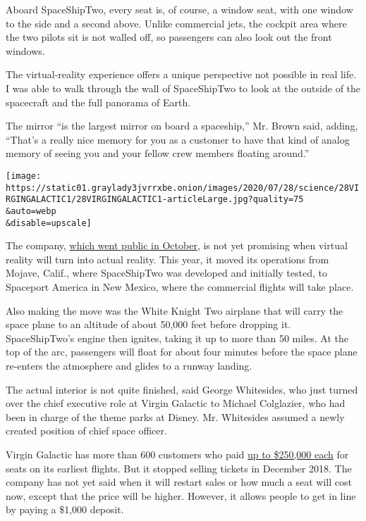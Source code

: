Aboard SpaceShipTwo, every seat is, of course, a window seat, with one
window to the side and a second above. Unlike commercial jets, the
cockpit area where the two pilots sit is not walled off, so passengers
can also look out the front windows.

The virtual-reality experience offers a unique perspective not possible
in real life. I was able to walk through the wall of SpaceShipTwo to
look at the outside of the spacecraft and the full panorama of Earth.

The mirror ``is the largest mirror on board a spaceship,'' Mr. Brown
said, adding, ``That's a really nice memory for you as a customer to
have that kind of analog memory of seeing you and your fellow crew
members floating around.''

\texttt{[image: https://static01.graylady3jvrrxbe.onion/images/2020/07/28/science/28VIRGINGALACTIC1/28VIRGINGALACTIC1-articleLarge.jpg?quality=75\\\&auto=webp\\\&disable=upscale]}

The company,
\href{https://www.nytimes3xbfgragh.onion/2019/07/09/business/richard-branson-virgin-galactic-space.html}{which
went public in October}, is not yet promising when virtual reality will
turn into actual reality. This year, it moved its operations from
Mojave, Calif., where SpaceShipTwo was developed and initially tested,
to Spaceport America in New Mexico, where the commercial flights will
take place.

Also making the move was the White Knight Two airplane that will carry
the space plane to an altitude of about 50,000 feet before dropping it.
SpaceShipTwo's engine then ignites, taking it up to more than 50 miles.
At the top of the arc, passengers will float for about four minutes
before the space plane re-enters the atmosphere and glides to a runway
landing.

The actual interior is not quite finished, said George Whitesides, who
just turned over the chief executive role at Virgin Galactic to Michael
Colglazier, who had been in charge of the theme parks at Disney. Mr.
Whitesides assumed a newly created position of chief space officer.

Virgin Galactic has more than 600 customers who paid
\href{https://www.nytimes3xbfgragh.onion/2019/10/16/science/virgin-galactic-spacesuit.html}{up
to \$250,000 each} for seats on its earliest flights. But it stopped
selling tickets in December 2018. The company has not yet said when it
will restart sales or how much a seat will cost now, except that the
price will be higher. However, it allows people to get in line by paying
a \$1,000 deposit.

